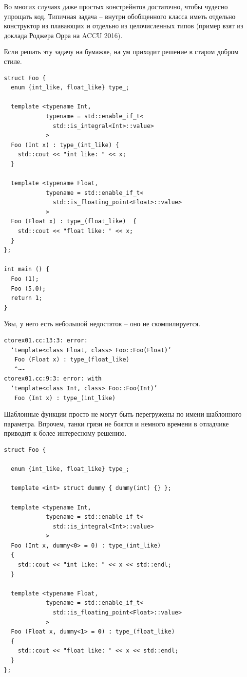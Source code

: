 \documentclass[a4paper,12pt,oneside]{article}
\begin{document}
Во многих случаях даже простых констрейнтов достаточно, чтобы чудесно упрощать код. Типичная задача -- внутри обобщенного класса иметь отдельно конструктор из плавающих и отдельно из целочисленных типов (пример взят из доклада Роджера Орра на ACCU 2016). 

Если решать эту задачу на бумажке, на ум приходит решение в старом добром стиле.

\begin{lstlisting}
struct Foo {
  enum {int_like, float_like} type_;

  template <typename Int, 
            typename = std::enable_if_t<
              std::is_integral<Int>::value>
            >
  Foo (Int x) : type_(int_like) { 
    std::cout << "int like: " << x; 
  }

  template <typename Float, 
            typename = std::enable_if_t<
              std::is_floating_point<Float>::value>
            >
  Foo (Float x) : type_(float_like)  { 
    std::cout << "float like: " << x; 
  }
};

int main () {
  Foo (1);
  Foo (5.0);
  return 1;
}
\end{lstlisting}

Увы, у него есть небольшой недостаток -- оно не скомпилируется.

\begin{verbatim}
ctorex01.cc:13:3: error: 
  ‘template<class Float, class> Foo::Foo(Float)’ 
   Foo (Float x) : type_(float_like)     
   ^~~
ctorex01.cc:9:3: error: with 
  ‘template<class Int, class> Foo::Foo(Int)’
   Foo (Int x) : type_(int_like)
\end{verbatim}

Шаблонные функции просто не могут быть перегружены по имени шаблонного параметра. Впрочем, танки грязи не боятся и немного времени в отладчике приводит к более интересному решению.

\begin{lstlisting}
struct Foo {

  enum {int_like, float_like} type_;

  template <int> struct dummy { dummy(int) {} };

  template <typename Int,
            typename = std::enable_if_t<
              std::is_integral<Int>::value>
            >
  Foo (Int x, dummy<0> = 0) : type_(int_like)
  {
    std::cout << "int like: " << x << std::endl;
  }

  template <typename Float,
            typename = std::enable_if_t<
              std::is_floating_point<Float>::value>
            >
  Foo (Float x, dummy<1> = 0) : type_(float_like)
  {
    std::cout << "float like: " << x << std::endl;
  }
};
\end{lstlisting}
\end{document}
